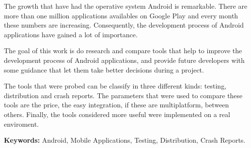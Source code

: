 
The growth that have had the operative system Android is remarkable. There are more than one million applications availables on Google Play and every month these numbers are increasing. Consequently, the development process of Android applications have gained a lot of importance.

The goal of this work is do research and compare tools that help to improve the development process of Android applications, and provide future developers with some guidance that let them take better decisions during a project.

The tools that were probed can be classify in three different kinds: testing, distribution and crash reports. The parameters that were used to compare these tools are the price, the easy integration, if these are multiplatform, between others. Finally, the tools considered more useful were implemented on a real enviroment.

\textbf{Keywords:} Android, Mobile Applications, Testing, Distribution, Crash Reports.

